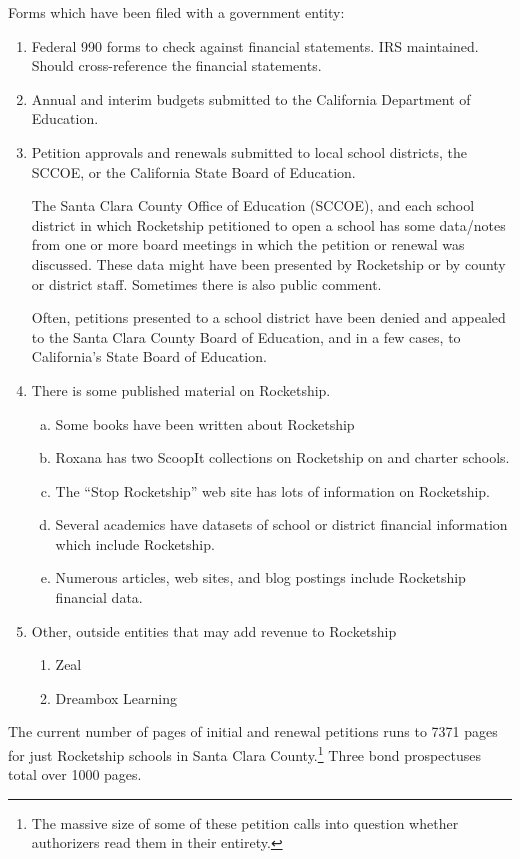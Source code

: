 Forms which have been filed with a government entity:
 \begin{enumerate}
  \item Federal 990 forms to check against financial statements. IRS maintained. Should cross-reference the financial statements.
  \item Annual and interim budgets submitted to the California Department of Education.
  \item Petition approvals and renewals submitted to local school districts, the SCCOE, or the California State Board of Education.

  The Santa Clara County Office of Education (SCCOE), and each school district in which Rocketship petitioned to open a school has some data/notes from one or more board meetings in which the petition or renewal was discussed. These data might have been presented by Rocketship or by county or district staff. Sometimes there is also public comment.
  
Often, petitions presented to a school district have been denied and appealed to the Santa Clara County Board of Education, and in a few cases, to California's State Board of Education.
  
  \item There is some published material on Rocketship.
  \begin{enumerate}[a.]
    \item Some books have been written about Rocketship
    \item Roxana has two ScoopIt collections on Rocketship on and charter schools.
    \item The ``Stop Rocketship'' web site has lots of information on Rocketship.
    \item Several academics have datasets of school or district financial information  which include Rocketship.
    \item Numerous articles, web sites, and blog postings include Rocketship financial data.
  \end{enumerate}
  \item Other, outside entities that may add revenue to Rocketship
  \begin{enumerate}
    \item Zeal
    \item Dreambox Learning
  \end{enumerate}
\end{enumerate}

The current number of pages of initial and renewal petitions runs to 7371 pages for just Rocketship schools in Santa Clara County.\footnote{The massive size of some of these petition calls into question whether authorizers read them in their entirety.} Three bond prospectuses total over 1000 pages.

